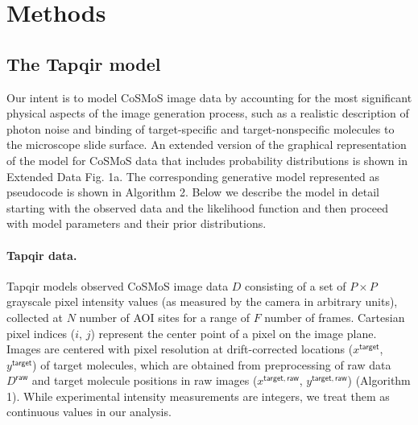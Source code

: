 \section*{Methods}

\subsection*{The Tapqir model} 

Our intent is to model CoSMoS image data by accounting for the most significant physical aspects of the image generation process, such as a realistic description of photon noise and binding of target-specific and target-nonspecific molecules to the microscope slide surface. An extended version of the graphical representation of the model for CoSMoS data that includes probability distributions is shown in Extended Data Fig. 1a. The corresponding generative model represented as pseudocode is shown in Algorithm 2. Below we describe the model in detail starting with the observed data and the likelihood function and then proceed with model parameters and their prior distributions.


\paragraph{Tapqir data.} Tapqir models observed CoSMoS image data $D$ consisting of a set of $P \times P$ grayscale pixel intensity values (as measured by the camera in arbitrary units), collected at $N$ number of AOI sites for a range of $F$ number of frames. Cartesian pixel indices ($i$, $j$) represent the center point of a pixel on the image plane. Images are centered with pixel resolution at drift-corrected locations ($x^\mathsf{target}$, $y^\mathsf{target}$) of target molecules, which are obtained from preprocessing of raw data $D^\mathsf{raw}$ and target molecule positions in raw images ($x^{\mathsf{target}, \mathsf{raw}}$, $y^{\mathsf{target}, \mathsf{raw}}$) (Algorithm 1). While experimental intensity measurements are integers, we treat them as continuous values in our analysis.




